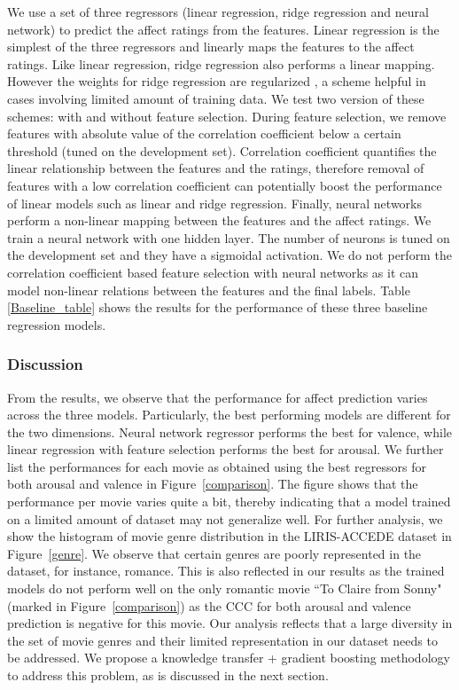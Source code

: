 \documentclass{article}
\begin{document}
We use a set of three regressors (linear regression, ridge regression and neural network) to predict the affect ratings from the features. 
Linear regression \cite{} is the simplest of the three regressors and linearly maps the features to the affect ratings.
Like linear regression, ridge regression \cite{} also performs a linear mapping.
However the weights for ridge regression are regularized \cite{}, a scheme helpful in cases involving limited amount of training data.
We test two version of these schemes: with and without feature selection.
During feature selection, we remove features with absolute value of the correlation coefficient below a certain threshold (tuned on the development set).
Correlation coefficient quantifies the linear relationship between the features and the ratings, therefore removal of features with a low correlation coefficient can potentially boost the performance of linear models such as linear and ridge regression. 
Finally, neural networks perform a non-linear mapping between the features and the affect ratings. 
We train a neural network with one hidden layer.
The number of neurons is tuned on the development set and they have a sigmoidal activation.
We do not perform the correlation coefficient based feature selection with neural networks as it can model non-linear relations between the features and the final labels. 
Table \ref{Baseline_table} shows the results for the performance of these three baseline regression models. 


\subsubsection{Discussion} From the results, we observe that the performance for affect prediction varies across the three models.
Particularly, the best performing models are different for the two dimensions.
Neural network regressor performs the best for valence, while linear regression with feature selection performs the best for arousal.
We further list the performances for each movie as obtained using the best regressors for both arousal and valence in Figure~\ref{comparison}. 
The figure shows that the performance per movie varies quite a bit, thereby indicating that a model trained on a limited amount of dataset may not generalize well.
For further analysis, we show the histogram of movie genre distribution in the LIRIS-ACCEDE dataset in Figure~\ref{genre}.
We observe that certain genres are poorly represented in the dataset, for instance, romance.
This is also reflected in our results as the trained models do not perform well on the only romantic movie ``To Claire from Sonny" (marked in Figure~\ref{comparison}) as the CCC for both arousal and valence prediction is negative for this movie. 
Our analysis reflects that a large diversity in the set of movie genres and their limited representation in our dataset needs to be addressed.
We propose a knowledge transfer + gradient boosting methodology to address this problem, as is discussed in the next section.
\end{document}
